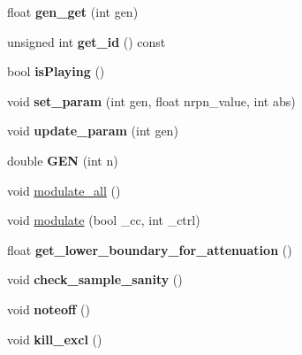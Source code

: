 \begin{DoxyCompactItemize}
float {\bfseries gen\+\_\+get} (int gen)
\item 
\mbox{\label{class_fluid_s_1_1_voice_acf9e43c99188c7c1290d8ebf9383b046}} 
unsigned int {\bfseries get\+\_\+id} () const
\item 
\mbox{\label{class_fluid_s_1_1_voice_a57567e90fed01748628ea8733bc34ac6}} 
bool {\bfseries is\+Playing} ()
\item 
\mbox{\label{class_fluid_s_1_1_voice_a5495479514cb10d0040e4fd7d1a77da8}} 
void {\bfseries set\+\_\+param} (int gen, float nrpn\+\_\+value, int abs)
\item 
\mbox{\label{class_fluid_s_1_1_voice_acaa0a1d8b3a451e9c1a2ea41c7e1a758}} 
void {\bfseries update\+\_\+param} (int gen)
\item 
\mbox{\label{class_fluid_s_1_1_voice_a99d7c39c3ae7ce1046afd5ff032796bb}} 
double {\bfseries G\+EN} (int n)
\item 
void \hyperlink{class_fluid_s_1_1_voice_ae50c72121f4700b97c407ef260efb94b}{modulate\+\_\+all} ()
\item 
void \hyperlink{class_fluid_s_1_1_voice_a474d2173990e1d7996168688a6c111c2}{modulate} (bool \+\_\+cc, int \+\_\+ctrl)
\item 
\mbox{\label{class_fluid_s_1_1_voice_a2a2ef454e88e617c90ebbd4c54d6189c}} 
float {\bfseries get\+\_\+lower\+\_\+boundary\+\_\+for\+\_\+attenuation} ()
\item 
\mbox{\label{class_fluid_s_1_1_voice_affe4ab3af432f986cb7e9b181251943b}} 
void {\bfseries check\+\_\+sample\+\_\+sanity} ()
\item 
\mbox{\label{class_fluid_s_1_1_voice_ad376063d7493ced068c484eebd6caf67}} 
void {\bfseries noteoff} ()
\item 
\mbox{\label{class_fluid_s_1_1_voice_a7ec7cd83c7123ab83cb0efd83df32a1f}} 
void {\bfseries kill\+\_\+excl} ()
\item 
\mbox{\label{class_fluid_s_1_1_voice_ac03d9facb18a4f4feef6cfd31fd6cc5f}} 

\end{DoxyCompactItemize}
